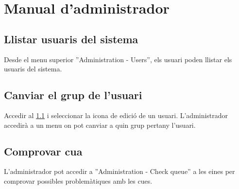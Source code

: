 \chapter{Manual d'administrador}
\label{cha:adminguide}

\section{Llistar usuaris del sistema}
\label{sec:list_users}
Desde el menu superior ''Administration - Users'', els usuari poden llistar els usuaris del sistema.

\section{Canviar el grup de l'usuari}
Accedir al \ref{sec:list_users} i seleccionar la icona de edici\'{o} de un usuari. L'administrador accedir\`{a} a un menu on pot canviar a quin grup pertany l'usuari.

\section{Comprovar cua}
L'administrador pot accedir a ''Administration - Check queue'' a les eines per comprovar possibles problem\`{a}tiques amb les cues.
